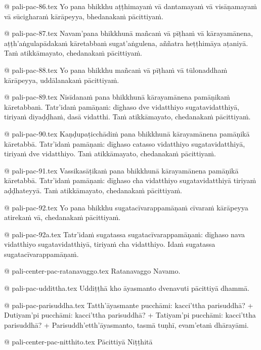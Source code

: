@ pali-pac-86.tex
Yo pana bhikkhu aṭṭhimayaṁ vā dantamayaṁ vā visāṇamayaṁ vā sūcigharaṁ kārāpeyya, bhedanakaṁ pācittiyaṁ.

@ pali-pac-87.tex
Navam’pana bhikkhunā mañcaṁ vā pīṭhaṁ vā kārayamānena, aṭṭh’aṅgulapādakaṁ kāretabbaṁ sugat’aṅgulena, aññatra heṭṭhimāya aṭaniyā. Taṁ atikkāmayato, chedanakaṁ pācittiyaṁ.

@ pali-pac-88.tex
Yo pana bhikkhu mañcaṁ vā pīṭhaṁ vā tūlonaddhaṁ kārāpeyya, uddālanakaṁ pācittiyaṁ.

@ pali-pac-89.tex
Nisīdanaṁ pana bhikkhunā kārayamānena pamāṇikaṁ kāretabbaṁ. Tatr’idaṁ pamāṇaṁ: dīghaso dve vidatthiyo sugatavidatthiyā, tiriyaṁ diyaḍḍhaṁ, dasā vidatthi. Taṁ atikkāmayato, chedanakaṁ pācittiyaṁ.

@ pali-pac-90.tex
Kaṇḍupaṭicchādiṁ pana bhikkhunā kārayamānena pamāṇikā kāretabbā. Tatr’idaṁ pamāṇaṁ: dīghaso catasso vidatthiyo sugatavidatthiyā, tiriyaṁ dve vidatthiyo. Taṁ atikkāmayato, chedanakaṁ pācittiyaṁ.

@ pali-pac-91.tex
Vassikasāṭikaṁ pana bhikkhunā kārayamānena pamāṇikā kāretabbā. Tatr’idaṁ pamāṇaṁ: dīghaso cha vidatthiyo sugatavidatthiyā tiriyaṁ aḍḍhateyyā. Taṁ atikkāmayato, chedanakaṁ pācittiyaṁ.

@ pali-pac-92.tex
Yo pana bhikkhu sugatacīvarappamāṇaṁ cīvaraṁ kārāpeyya atirekaṁ vā, chedanakaṁ pācittiyaṁ.

@ pali-pac-92a.tex
Tatr’idaṁ sugatassa sugatacīvarappamāṇaṁ: dīghaso nava vidatthiyo sugatavidatthiyā, tiriyaṁ cha vidatthiyo. Idaṁ sugatassa sugatacīvarappamāṇaṁ.

@ pali-center-pac-ratanavaggo.tex
Ratanavaggo Navamo.

@ pali-pac-uddittha.tex
Uddiṭṭhā kho āyasmanto dvenavuti pācittiyā dhammā.

@ pali-pac-parisuddha.tex
Tatth’āyasmante pucchāmi: kacci’ttha parisuddhā? +
Dutiyam’pi pucchāmi: kacci’ttha parisuddhā? +
Tatiyam’pi pucchāmi: kacci’ttha parisuddhā? +
Parisuddh’etth’āyasmanto, tasmā tuṇhī, evam’etaṁ dhārayāmi.

@ pali-center-pac-nitthito.tex
Pācittiyā Niṭṭhitā
